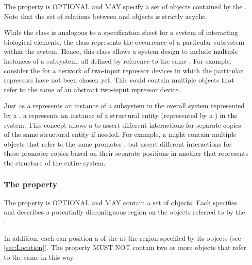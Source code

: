 The  property is OPTIONAL and MAY specify a set of  objects contained by the .
Note that the set of relations between  and  objects is strictly acyclic. 

While the  class is analogous to a specification sheet for a system of interacting biological elements, the  class represents the occurrence of a particular subsystem within the system.
Hence, this class allows a system design to include multiple instances of a subsystem, all defined by reference to the same .
For example, consider the  for a network of two-input repressor devices in which the particular repressors have not been chosen yet. This  could contain multiple  objects that refer to the same  of an abstract two-input repressor device.

Just as a  represents an instance of a subsystem in the overall system represented by a  , a  represents an instance of a structural entity (represented by a ) in the system. This concept allows a  to assert different interactions for separate copies of the same structural entity if needed. For example, a  might contain multiple   objects that refer to the same promoter , but assert different interactions for these promoter copies based on their separate positions in another  that represents the structure of the entire system.



\subsubsection*{The  property}
\label{sec:feature}

The  property is OPTIONAL and MAY contain a set of  objects. Each  specifies and describes a potentially discontiguous region on the  objects referred to by the .

In addition, each  can  position a  of the  at the region specified by its  objects (see \ref{sec:Location}). 
The  property MUST NOT contain two or more  objects that refer to the same  in this way.

